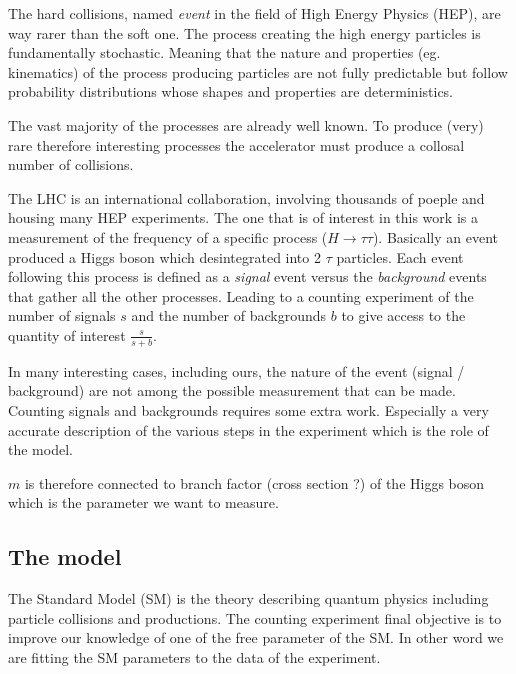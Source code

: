 The hard collisions, named \emph{event} in the field of High Energy Physics (HEP), are way rarer than the soft one.
The process creating the high energy particles is fundamentally stochastic.
Meaning that the nature and properties (eg. kinematics) of the process producing particles are not fully predictable but follow
probability distributions whose shapes and properties are deterministics.

The vast majority of the processes are already well known.
To produce (very) rare therefore interesting processes the accelerator must produce a collosal number of collisions.

The LHC is an international collaboration, involving thousands of poeple and housing many HEP experiments.
The one that is of interest in this work is a measurement of the frequency of a specific process ($H \to \tau \tau$).
Basically an event produced a Higgs boson which desintegrated into 2 $\tau$ particles.
Each event following this process is defined as a \emph{signal} event versus the \emph{background} events that gather all the other processes.
Leading to a counting experiment of the number of signals $s$ and the number of backgrounds $b$ to give access to the quantity of interest $\frac{s}{s + b}$.

In many interesting cases, including ours, the nature of the event (signal / background) are not among the possible measurement that can be made.
Counting signals and backgrounds requires some extra work.
Especially a very accurate description of the various steps in the experiment which is the role of the model.


$m$ is therefore connected to branch factor (cross section ?) of the Higgs boson which is the parameter we want to measure.





\subsection{The model} %
\label{sub:the_model}

The Standard Model \needcite (SM) is the theory describing quantum physics including particle collisions and productions.
The counting experiment final objective is to improve our knowledge of one of the free parameter of the SM.
In other word we are fitting the SM parameters to the data of the experiment.


